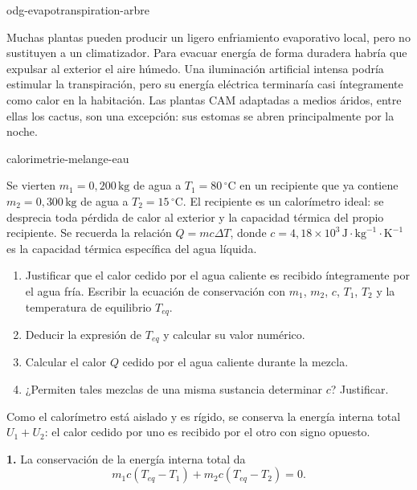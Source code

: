 \begin{exo}{odg-evapotranspiration-arbre}
\begin{solution}
Muchas plantas pueden producir un ligero enfriamiento evaporativo local, pero no sustituyen a un climatizador. Para evacuar energía de forma duradera habría que expulsar al exterior el aire húmedo. Una iluminación artificial intensa podría estimular la transpiración, pero su energía eléctrica terminaría casi íntegramente como calor en la habitación. Las plantas CAM adaptadas a medios áridos, entre ellas los cactus, son una excepción: sus estomas se abren principalmente por la noche.
\end{solution}
\end{exo}

\begin{exo}{calorimetrie-melange-eau}

Se vierten $m_1=0{,}200\,\text{kg}$ de agua a $T_1=80\,^\circ\text{C}$ en un recipiente que ya contiene $m_2=0{,}300\,\text{kg}$ de agua a $T_2=15\,^\circ\text{C}$. El recipiente es un calorímetro ideal: se desprecia toda pérdida de calor al exterior y la capacidad térmica del propio recipiente. Se recuerda la relación $Q=mc\Delta T$, donde $c=4{,}18\times10^3\,\text{J}\!\cdot\!\text{kg}^{-1}\!\cdot\!\text{K}^{-1}$ es la capacidad térmica específica del agua líquida.

\begin{enumerate}
  \item Justificar que el calor cedido por el agua caliente es recibido íntegramente por el agua fría. Escribir la ecuación de conservación con $m_1$, $m_2$, $c$, $T_1$, $T_2$ y la temperatura de equilibrio $T_{eq}$.
  \item Deducir la expresión de $T_{eq}$ y calcular su valor numérico.
  \item Calcular el calor $Q$ cedido por el agua caliente durante la mezcla.
  \item ¿Permiten tales mezclas de una misma sustancia determinar $c$? Justificar.
\end{enumerate}

\begin{indication}
Como el calorímetro está aislado y es rígido, se conserva la energía interna total $U_1+U_2$: el calor cedido por uno es recibido por el otro con signo opuesto.
\end{indication}

\begin{solution}
\textbf{1.} La conservación de la energía interna total da
\[
m_1c(T_{eq}-T_1)+m_2c(T_{eq}-T_2)=0.
\]


\end{solution}
\end{exo}

